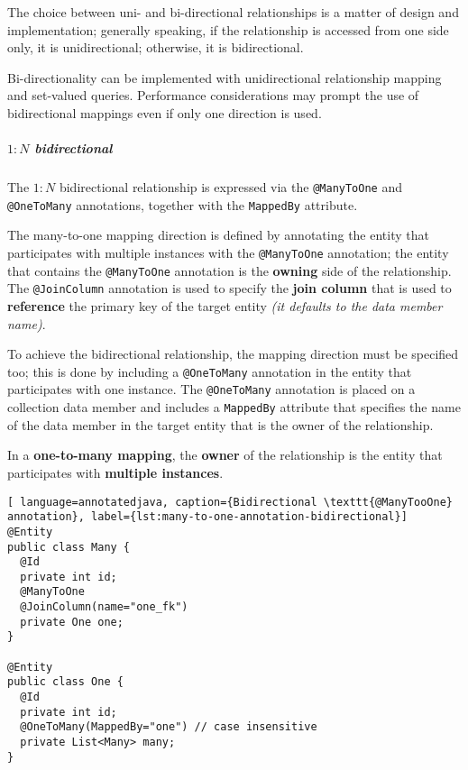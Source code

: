\documentclass[english]{article}
\begin{document}
The choice between uni- and bi-directional relationships is a matter of design and implementation;
generally speaking, if the relationship is accessed from one side only, it is unidirectional;
otherwise, it is bidirectional.

Bi-directionality can be implemented with unidirectional relationship mapping and set-valued queries.
Performance considerations may prompt the use of bidirectional mappings even if only one direction is used.

\begin{onepage}
  \subparagraph*{\(1:N\) bidirectional}

  The \(1:N\) bidirectional relationship is expressed via the \texttt{@ManyToOne} and \texttt{@OneToMany} annotations, together with the \texttt{MappedBy} attribute.

  The many-to-one mapping direction is defined by annotating the entity that participates with multiple instances with the \texttt{@ManyToOne} annotation;
  the entity that contains the \texttt{@ManyToOne} annotation is the \textbf{owning} side of the relationship.
  The \texttt{@JoinColumn} annotation is used to specify the \textbf{join column} that is used to \textbf{reference} the primary key of the target entity \textit{(it defaults to the data member name)}.

  To achieve the bidirectional relationship, the mapping direction must be specified too;
  this is done by including a \texttt{@OneToMany} annotation in the entity that participates with one instance.
  The \texttt{@OneToMany} annotation is placed on a collection data member and includes a \texttt{MappedBy} attribute that specifies the name of the data member in the target entity that is the owner of the relationship.

  In a \textbf{one-to-many mapping}, the \textbf{owner} of the relationship is the entity that participates with \textbf{multiple instances}.

  \begin{lstlisting}[ language=annotatedjava, caption={Bidirectional \texttt{@ManyTooOne} annotation}, label={lst:many-to-one-annotation-bidirectional}]
@Entity
public class Many {
  @Id
  private int id;
  @ManyToOne
  @JoinColumn(name="one_fk")
  private One one;
}

@Entity
public class One {
  @Id
  private int id;
  @OneToMany(MappedBy="one") // case insensitive
  private List<Many> many;
}
\end{lstlisting}
\end{onepage}
\end{document}
